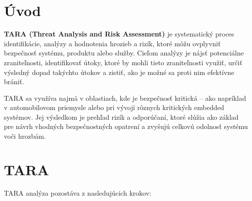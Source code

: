 \documentclass[11pt]{article}
\begin{document}

\tableofcontents
\newpage

\section{Úvod}
\textbf{TARA (Threat Analysis and Risk Assessment)} je systematický proces identifikácie, analýzy a hodnotenia hrozieb a rizík, ktoré môžu ovplyvniť bezpečnosť systému, produktu alebo služby. Cieľom analýzy je nájsť potenciálne zraniteľnosti, identifikovať útoky, ktoré by mohli tieto zraniteľnosti využiť, určiť výsledný dopad takýchto útokov a zistiť, ako je možné sa proti nim efektívne brániť.

TARA sa využíva najmä v oblastiach, kde je bezpečnosť kritická -- ako napríklad v automobilovom priemysle alebo pri vývoji rôznych kritických embedded systémov. Jej výsledkom je prehľad rizík a odporúčaní, ktoré slúžia ako základ pre návrh vhodných bezpečnostných opatrení a zvyšujú celkovú odolnosť systému voči hrozbám.

\section{TARA}
TARA analýza pozostáva z nasledujúcich krokov:
\end{document}
